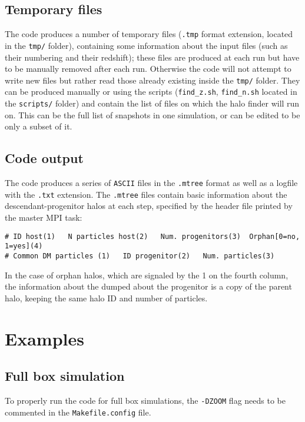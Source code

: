 \documentclass{article}
\begin{document}
\subsection{Temporary files}

The code produces a number of temporary files (\texttt{.tmp} format extension, located in the \texttt{tmp/} folder), containing
some information about the input files (such as their numbering and their redshift); these files are produced at each run but have
to be manually removed after each run. Otherwise the code will not attempt to write new files but rather read those already existing
inside the \texttt{tmp/} folder.
They can be produced manually or using the scripts (\texttt{find\_z.sh}, \texttt{find\_n.sh} located in the \texttt{scripts/} folder)
and contain the list of files on which the halo finder will run on.
This can be the full list of snapshots in one simulation, or can be edited to be only a subset of it.

\subsection{Code output}
The code produces a series of \texttt{ASCII} files in the \texttt{.mtree} format 
as well as a logfile with the \texttt{.txt} extension.
The \texttt{.mtree} files contain basic information about the descendant-progenitor halos at each step, specified by the
header file printed by the master MPI task: \\

\begin{verbatim}
# ID host(1)   N particles host(2)   Num. progenitors(3)  Orphan[0=no, 1=yes](4)
# Common DM particles (1)   ID progenitor(2)   Num. particles(3)
\end{verbatim} 

\noindent
In the case of orphan halos, which are signaled by the 1 on the fourth column, the information about the
dumped about the progenitor is a copy of the parent halo, keeping the same halo ID and number of particles.


\section{Examples}

\subsection{Full box simulation}
To properly run the code for full box simulations, the \texttt{-DZOOM} flag needs to be commented in the \texttt{Makefile.config} file.
\end{document}
